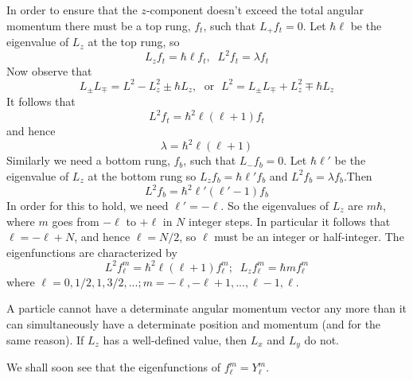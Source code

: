 \documentclass[12pt, a4paper, oneside, openright, titlepage]{book}
\begin{document}
In order to ensure that the $z$-component doesn't exceed the total angular momentum there must be a top rung, $f_t$, such that $L_+f_t = 0$. Let $\hbar \ell$ be the eigenvalue of $L_z$ at the top rung, so \begin{equation*}
    L_zf_t = \hbar \ell f_t,\;\;L^2f_t = \lambda f_t
\end{equation*}
Now observe that \begin{equation*}
    L_{\pm}L_{\mp} = L^2 - L_z^2 \pm\hbar L_z,\;\text{ or }\;L^2 = L_{\pm}L_{\mp} + L_z^2 \mp \hbar L_z
\end{equation*}
It follows that \begin{equation*}
    L^2f_t = \hbar^2\ell(\ell+1)f_t
\end{equation*}
and hence $$\lambda = \hbar^2\ell(\ell+1)$$
Similarly we need a bottom rung, $f_b$, such that $L_-f_b = 0$. Let $\hbar\ell'$ be the eigenvalue of $L_z$ at the bottom rung so $L_zf_b=\hbar\ell'f_b$ and $L^2f_b = \lambda f_b$.Then \begin{equation*}
    L^2f_b = \hbar^2\ell'(\ell'-1)f_b
\end{equation*}
In order for this to hold, we need $\ell' = -\ell$. So the eigenvalues of $L_z$ are $m\hbar$, where $m$ goes from $-\ell$ to $+\ell$ in $N$ integer steps. In particular it follows that $\ell = -\ell+N$, and hence $\ell = N/2$, so $\ell$ must be an integer or half-integer. The eigenfunctions are characterized by \begin{equation*}
    \boxed{L^2f_{\ell}^m = \hbar^2\ell(\ell+1)f_{\ell}^m;\;\;L_zf_{\ell}^m=\hbar mf_{\ell}^m}
\end{equation*}
where $\ell = 0,1/2,1,3/2,...; m = -\ell,-\ell+1,...,\ell-1,\ell$. 
\begin{note}
    A particle cannot have a determinate angular momentum vector any more than it can simultaneously have a determinate position and momentum (and for the same reason). If $L_z$ has a well-defined value, then $L_x$ and $L_y$ do not.
\end{note}
We shall soon see that the eigenfunctions of $f_{\ell}^m = Y_{\ell}^m$.
\end{document}
